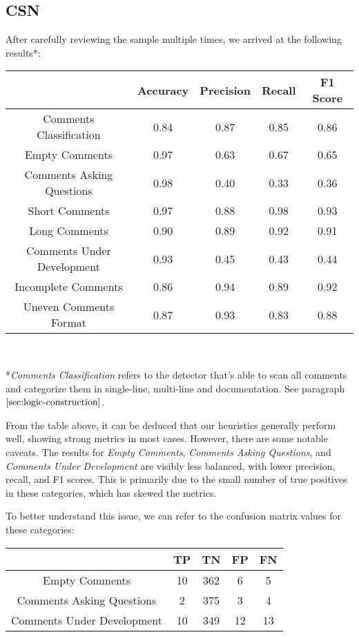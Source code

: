 \subsection{CSN}
After carefully reviewing the sample multiple times, we arrived at the following results*:

\begin{center}
	\begin{tabular}{|c|c|c|c|c|}
		\hline
		& \textbf{Accuracy} & \textbf{Precision} & \textbf{Recall} & \textbf{F1 Score} \\
		\hline Comments Classification    & 0.84     & 0.87      & 0.85   & 0.86    \\
		\hline Empty Comments             & 0.97     & 0.63      & 0.67   & 0.65    \\
		\hline Comments Asking Questions  & 0.98     & 0.40      & 0.33   & 0.36    \\
		\hline Short Comments             & 0.97     & 0.88      & 0.98   & 0.93    \\
		\hline Long Comments              & 0.90     & 0.89      & 0.92   & 0.91    \\
		\hline Comments Under Development & 0.93     & 0.45      & 0.43   & 0.44    \\
		\hline Incomplete Comments        & 0.86     & 0.94      & 0.89   & 0.92    \\
		\hline Uneven Comments Format     & 0.87     & 0.93      & 0.83   & 0.88   \\
		\hline
	\end{tabular}
	
	\textit{\\}
	
	*\textit{Comments Classification} refers to the detector that's able to scan all comments and categorize them in single-line, multi-line and documentation. See paragraph $\ref{sec:logic-construction}$.
\end{center}

\noindent From the table above, it can be deduced that our heuristics generally perform well, showing strong metrics in most cases. However, there are some notable caveats. The results for \textit{Empty Comments}, \textit{Comments Asking Questions}, and \textit{Comments Under Development} are visibly less balanced, with lower precision, recall, and F1 scores. This is primarily due to the small number of true positives in these categories, which has skewed the metrics.

\noindent To better understand this issue, we can refer to the confusion matrix values for these categories:
\begin{center}
	\begin{tabular}{|c|c|c|c|c|}
		\hline
		& \textbf{TP} & \textbf{TN} & \textbf{FP} & \textbf{FN} \\
		\hline Empty Comments             & 10     & 362      & 6   & 5    \\
		\hline Comments Asking Questions  & 2     & 375      & 3   & 4    \\
		\hline Comments Under Development & 10     & 349      & 12   & 13    \\
		\hline
	\end{tabular}
\end{center}

